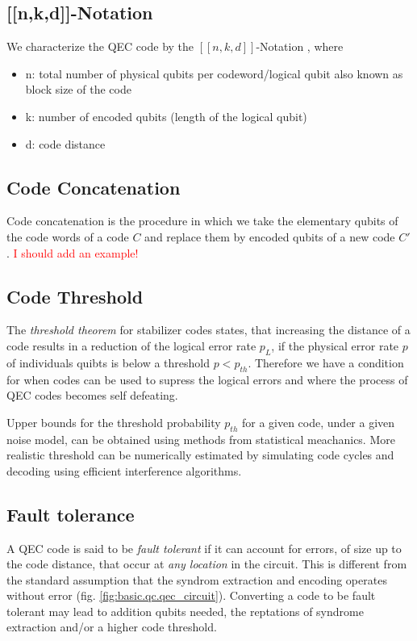 \subsection{[[n,k,d]]-Notation}\label{sssec:nkd_notation}
We characterize the QEC code by the $[[n,k,d]]$-Notation \cite{QECintro}, where 
\begin{itemize}
    \item n: total number of physical qubits per codeword/logical qubit 
    \subitem also known as block size of the code \cite{QECmemory}
    \item k: number of encoded qubits (length of the logical qubit)
    \item d: code distance
\end{itemize}


\subsection{Code Concatenation}
Code concatenation is the procedure in which we take the elementary qubits of the code words of a code $C$ 
and replace them by encoded qubits of a new code $C'$. \cite{QECmemory}
\textcolor{red}{I should add an example!}


\subsection{Code Threshold}
The \textit{threshold theorem} for stabilizer codes states,
that increasing the distance of a code results in a reduction of the logical error rate $p_L$,
if the physical error rate $p$ of individuals quibts is below a threshold $p<p_{th}$.
Therefore we have a condition for when codes can be used to supress the logical errors 
and where the process of QEC codes becomes self defeating. \cite{QECintro}

Upper bounds for the threshold probability $p_{th}$ for a given code, under a given noise model, 
can be obtained using methods from statistical meachanics.
More realistic threshold can be numerically estimated by simulating code cycles 
and decoding using efficient interference algorithms. \cite{QECintro}


\subsection{Fault tolerance}
A QEC code is said to be \textit{fault tolerant} 
if it can account for errors, of size up to the code distance, 
that occur at \textit{any location} in the circuit.
This is different from the standard assumption that the syndrom extraction and encoding operates without error
(fig. \ref{fig:basic.qc.qec_circuit}).
Converting a code to be fault tolerant may lead to addition qubits needed, 
the reptations of syndrome extraction and/or a higher code threshold. \cite{QECintro}


